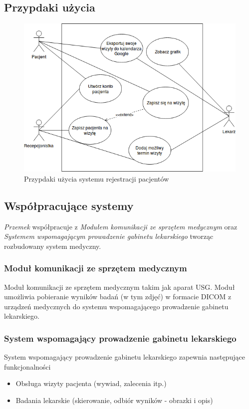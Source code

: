 \documentclass[polish,12pt]{aghthesis}
\begin{document}
\subsection{Przypdaki użycia}
    \begin{figure}[H]
        \includegraphics[width=\textwidth]{use-case-v1}
        \caption{Przypdaki użycia systemu rejestracji pacjentów}
    \end{figure}
    
\subsection{Współpracujące systemy}
\emph{Przemek} współpracuje z \emph{Modułem komunikacji ze sprzętem medycznym} oraz \emph{Systemem wspomagającym prowadzenie gabinetu lekarskiego} tworząc rozbudowany system medyczny.

\subsubsection{Moduł komunikacji ze sprzętem medycznym}
Moduł komunikacji ze sprzętem medycznym takim jak aparat USG. Moduł umożliwia pobieranie wyników badań (w tym zdjęć) w formacie DICOM z urządzeń medycznych do systemu wspomagającego prowadzenie gabinetu lekarskiego.
\subsubsection{System wspomagający prowadzenie gabinetu lekarskiego}
System wspomagający prowadzenie gabinetu lekarskiego zapewnia następujące funkcjonalności
\begin{itemize}
  \item Obsługa wizyty pacjenta (wywiad, zalecenia itp.)
  \item Badania lekarskie (skierowanie, odbiór wyników - obrazki i opis)
\end{itemize}
\end{document}
